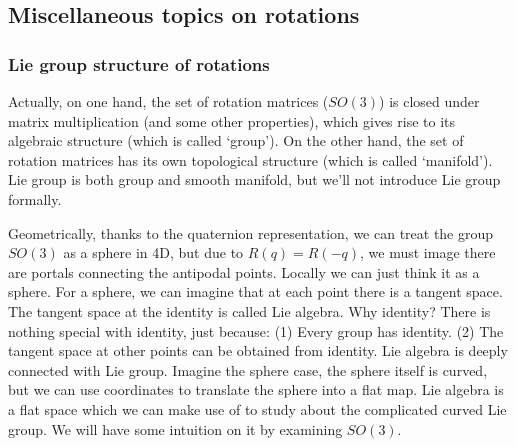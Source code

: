 \documentclass[
]{book}
\theoremstyle{definition}
\theoremstyle{definition}
\theoremstyle{definition}
\theoremstyle{definition}
\theoremstyle{remark}
\begin{document}
\hypertarget{miscellaneous-topics-on-rotations}{%
\subsection{Miscellaneous topics on rotations}\label{miscellaneous-topics-on-rotations}}

\hypertarget{lie-group-structure-of-rotations}{%
\subsubsection{Lie group structure of rotations}\label{lie-group-structure-of-rotations}}

Actually, on one hand, the set of rotation matrices (\(SO(3)\)) is closed under matrix multiplication (and some other properties), which gives rise to its algebraic structure (which is called `group'). On the other hand, the set of rotation matrices has its own topological structure (which is called `manifold'). Lie group is both group and smooth manifold, but we'll not introduce Lie group formally.

Geometrically, thanks to the quaternion representation, we can treat the group \(SO(3)\) as a sphere in 4D, but due to \(R(q) = R(-q)\), we must image there are portals connecting the antipodal points. Locally we can just think it as a sphere. For a sphere, we can imagine that at each point there is a tangent space. The tangent space at the identity is called Lie algebra. Why identity? There is nothing special with identity, just because: (1) Every group has identity. (2) The tangent space at other points can be obtained from identity. Lie algebra is deeply connected with Lie group. Imagine the sphere case, the sphere itself is curved, but we can use coordinates to translate the sphere into a flat map. Lie algebra is a flat space which we can make use of to study about the complicated curved Lie group. We will have some intuition on it by examining \(SO(3)\).
\end{document}
